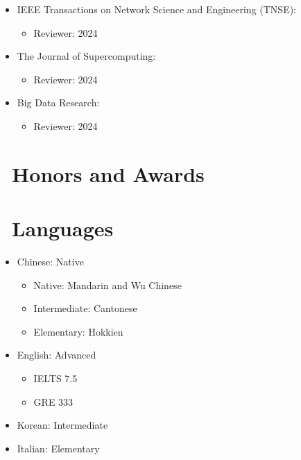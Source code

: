 \documentclass{resume}
\begin{document}
\begin{itemize}[parsep=0.5ex]
\begin{itemize}
    \item Reviewer: 2024
\end{itemize}
\item [{[J3]}] IEEE Transactions on Network Science and Engineering (TNSE):
\begin{itemize}
    \item Reviewer: 2024
\end{itemize}
 \item [{[J2]}] The Journal of Supercomputing:
 \begin{itemize}
    \item Reviewer: 2024
\end{itemize}
 \item [{[J1]}] Big Data Research:
 \begin{itemize}
    \item Reviewer: 2024
\end{itemize}
 \end{itemize}

\section{\faHeartO\ Honors and Awards}

\section{\faLanguage\ Languages}
\begin{itemize}[parsep=0.5ex]  
  \item Chinese: Native
  \begin{itemize}
      \item Native: Mandarin and Wu Chinese
      \item Intermediate: Cantonese
      \item Elementary: Hokkien
  \end{itemize}
  \item English: Advanced
  \begin{itemize}
      \item IELTS 7.5
      \item GRE 333
  \end{itemize}
  \item Korean: Intermediate
  \item Italian: Elementary
\end{itemize}

%
%
\end{document}
